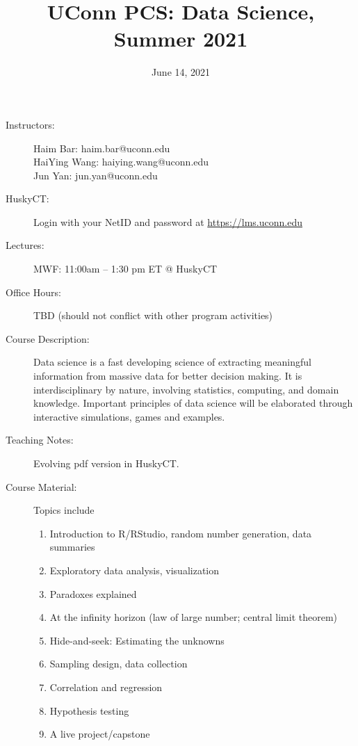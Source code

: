 \documentclass[twocolumn]{article}
\begin{document}
\title{UConn PCS: Data Science, Summer 2021}
\date{June 14, 2021}
\maketitle

\thispagestyle{fancy}


\begin{description}
\item[Instructors:] \hspace{0pt}

  Haim Bar: haim.bar@uconn.edu\\
  HaiYing Wang: haiying.wang@uconn.edu\\
  Jun Yan: jun.yan@uconn.edu

\item[HuskyCT:] Login with your NetID and password at
  \url{https://lms.uconn.edu}
  
\item[Lectures:] 
  MWF: 11:00am -- 1:30 pm ET @ HuskyCT

\item[Office Hours:]
  TBD (should not conflict with other program activities)


\item[Course Description:]
Data science is a fast developing science of extracting meaningful
information from massive data for better decision making. It is
interdisciplinary by nature, involving statistics, computing, and
domain knowledge. Important principles of data science will be
elaborated through interactive simulations, games and examples.


\item[Teaching Notes:] 
  Evolving pdf version in HuskyCT.
  
\item[Course Material:]

Topics include
\begin{enumerate}[noitemsep]
\item
  Introduction to R/RStudio, random number generation, data summaries
\item
  Exploratory data analysis, visualization
\item
  Paradoxes explained
\item
  At the infinity horizon (law of large number; central limit theorem)
\item
  Hide-and-seek: Estimating the unknowns
\item
  Sampling design, data collection
\item
  Correlation and regression
\item
  Hypothesis testing
\item
  A live project/capstone
\end{enumerate}


\end{description}
\end{document}

